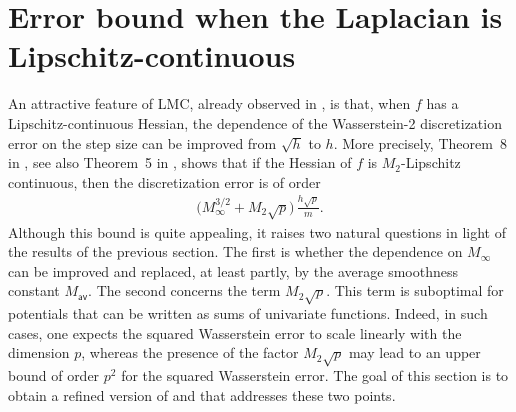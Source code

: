 \documentclass[aos,reqno]{imsart}
\def\Mav{M_{\textsf{av}}}
\def\Mmax{M_{\infty}}
\theoremstyle{definition}
\begin{document}
\section{Error bound when the Laplacian is 
Lipschitz-continuous}
\label{Sec:LLC}

An attractive feature of LMC, already observed in
\cite{alfonsi2015,durmus2019}, is that, when $f$ has a
Lipschitz-continuous Hessian, the dependence of the
Wasserstein-2 discretization error on the step size can
be improved from $\sqrt h$ to $h$. More precisely,
Theorem~8 in \cite{durmus2019}, see also Theorem~5 in
\cite{dalalyan2019user}, shows that if the Hessian of
$f$ is $M_2$-Lipschitz continuous, then the 
discretization error is of order
\begin{align}\label{eq:prior1}
    \big(\Mmax^{3/2} + M_2\sqrt p\big)\,\frac{h\sqrt 
    p}{m} .
\end{align}
Although this bound is quite appealing, it raises two
natural questions in light of the results of the previous
section. The first is whether the dependence on $\Mmax$
can be improved and replaced, at least partly, by the
average smoothness constant $\Mav$. The second concerns
the term $M_2\sqrt p$. This term is suboptimal for
potentials that can be written as sums of univariate
functions. Indeed, in such cases, one expects the squared
Wasserstein error to scale linearly with the dimension
$p$, whereas the presence of the factor $M_2\sqrt p$ may
lead to an upper bound of order $p^2$ for the squared
Wasserstein error. The goal of this section is to obtain
a refined version of \cite[Theorem~8]{durmus2019} and
\cite[Theorem~5]{dalalyan2019user} that addresses these
two points.
\end{document}
